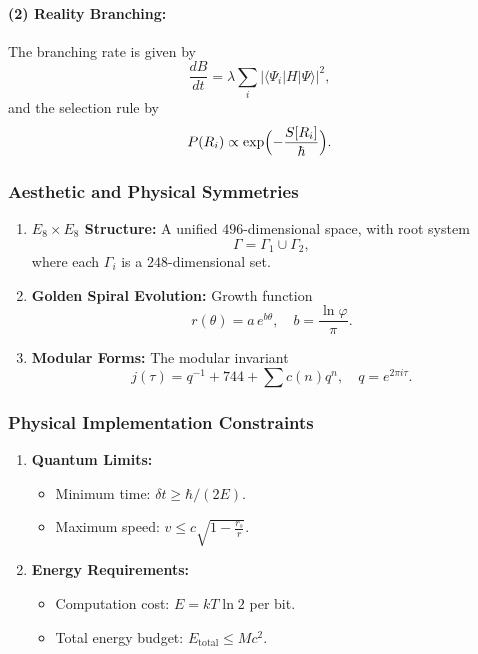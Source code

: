 \documentclass[11pt]{article}
\begin{document}
\paragraph{(2) Reality Branching:}
The branching rate is given by
\[
\frac{dB}{dt}=\lambda\sum_i |\langle\Psi_i|H|\Psi\rangle|^2,
\]
and the selection rule by
\[
P(R_i)\propto \exp\Bigl(-\frac{S[R_i]}{\hbar}\Bigr).
\]

\subsubsection{Aesthetic and Physical Symmetries}

\begin{enumerate}[label=(\arabic*)]
    \item \textbf{$E_8\times E_8$ Structure:} A unified $496$-dimensional space, with root system
    \[
    \Gamma=\Gamma_1\cup\Gamma_2,
    \]
    where each $\Gamma_i$ is a $248$-dimensional set.
    \item \textbf{Golden Spiral Evolution:} Growth function
    \[
    r(\theta)=a\,e^{b\theta}, \quad b=\frac{\ln\varphi}{\pi}.
    \]
    \item \textbf{Modular Forms:} The modular invariant
    \[
    j(\tau)=q^{-1}+744+\sum c(n)q^n, \quad q=e^{2\pi i\tau}.
    \]
\end{enumerate}

\subsubsection{Physical Implementation Constraints}

\begin{enumerate}[label=(\arabic*)]
    \item \textbf{Quantum Limits:}
    \begin{itemize}
        \item Minimum time: $\delta t\ge \hbar/(2E)$.
        \item Maximum speed: $v\le c\sqrt{1-\frac{r_s}{r}}$.
    \end{itemize}
    \item \textbf{Energy Requirements:}
    \begin{itemize}
        \item Computation cost: $E=kT\ln2$ per bit.
        \item Total energy budget: $E_{\text{total}}\le Mc^2$.
    \end{itemize}
\end{enumerate}
\end{document}
